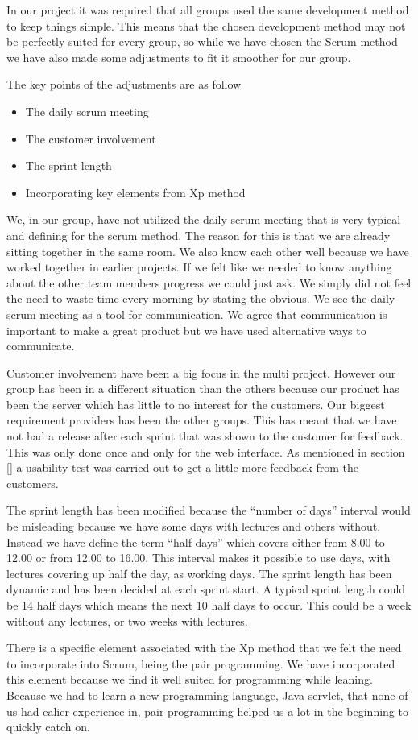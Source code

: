 In our project it was required that all groups used the same development method to keep things simple. This means that the chosen development method may not be perfectly suited for every group, so while we have chosen the Scrum method we have also made some adjustments to fit it smoother for our group.

The key points of the adjustments are as follow

\begin{itemize}
\item The daily scrum meeting
\item The customer involvement
\item The sprint length
\item Incorporating key elements from Xp method
\end{itemize}

We, in our group, have not utilized the daily scrum meeting that is very typical and defining for the scrum method. The reason for this is that we are already sitting together in the same room. We also know each other well because we have worked together in earlier projects. If we felt like we needed to know anything about the other team members progress we could just ask. We simply did not feel the need to waste time every morning by stating the obvious. We see the daily scrum meeting as a tool for communication. We agree that communication is important to make a great product but we have used alternative ways to communicate.

Customer involvement have been a big focus in the multi project. However our group has been in a different situation than the others because our product has been the server which has little to no interest for the customers. Our biggest requirement providers has been the other groups. This has meant that we have not had a release after each sprint that was shown to the customer for feedback. This was only done once and only for the web interface. As mentioned in section [] a usability test was carried out to get a little more feedback from the customers. 

The sprint length has been modified because the ``number of days'' interval would be misleading because we have some days with lectures and others without. Instead we have define the term ``half days'' which covers either from 8.00 to 12.00 or from 12.00 to 16.00. This interval makes it possible to use days, with lectures covering up half the day, as working days. The sprint length has been dynamic and has been decided at each sprint start. A typical sprint length could be 14 half days which means the next 10 half days to occur. This could be a week without any lectures, or two weeks with lectures. 

There is a specific element associated with the Xp method that we felt the need to incorporate into Scrum, being the pair programming. We have incorporated this element because we find it well suited for programming while leaning. Because we had to learn a new programming language, Java servlet, that none of us had ealier experience in, pair programming helped us a lot in the beginning to quickly catch on.